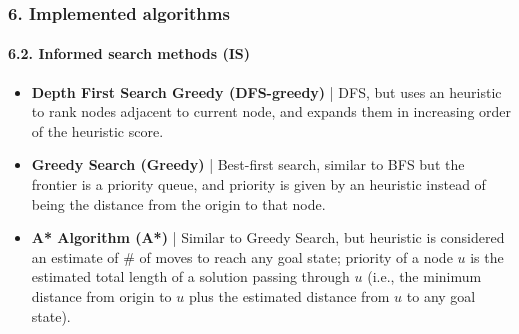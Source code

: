 \documentclass{beamer}
\begin{document}
\begin{frame}
\frametitle{6. Implemented algorithms}
\framesubtitle{6.2. Informed search methods (IS)}

\begin{itemize}  
  \item \textbf{Depth First Search Greedy (DFS-greedy)} | DFS, but uses an heuristic to rank nodes adjacent to current node, and expands them in increasing order of the heuristic score.
  \item \textbf{Greedy Search (Greedy)} | Best-first search, similar to BFS but the frontier is a priority queue, and priority is given by an heuristic instead of being the distance from the origin to that node.
  \item \textbf{A* Algorithm (A*)} | Similar to Greedy Search, but heuristic is considered an estimate of \# of moves to reach any goal state; priority of a node $u$ is the estimated total length of a solution passing through $u$ (i.e., the minimum distance from origin to $u$ plus the estimated distance from $u$ to any goal state).
\end{itemize}
\end{frame}
\end{document}
